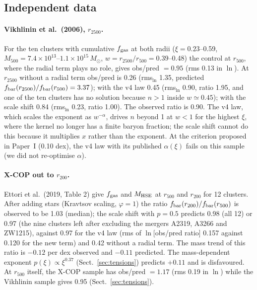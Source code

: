 \documentclass[11pt,a4paper]{article}
\newcommand{\Msun}{M_\odot}
\newcommand{\fbar}{f_{\rm bar}}
\newcommand{\fgas}{f_{\rm gas}}
\begin{document}
\subsection{Independent data}
\paragraph{Vikhlinin et al.\ (2006), $r_{2500}$.} For the ten clusters with cumulative $\fgas$ at both radii ($\xi=0.23$--0.59, $M_{500}=7.4\times10^{13}$--$1.1\times10^{15}\,\Msun$, $w=r_{2500}/r_{500}=0.39$--0.48) the control at $r_{500}$, where the radial term plays no role, gives obs/pred $=0.95$ (rms 0.13 in $\ln$). At $r_{2500}$ without a radial term obs/pred is 0.26 (rms$_{\ln}$ 1.35, predicted $\fbar(r_{2500})/\fbar(r_{500})=3.37$); with the v4 law 0.45 (rms$_{\ln}$ 0.90, ratio 1.95, and one of the ten clusters has no solution because $n>1$ inside $w\simeq0.45$); with the scale shift 0.84 (rms$_{\ln}$ 0.23, ratio 1.00). The observed ratio is 0.90. The v4 law, which scales the exponent as $w^{-\alpha}$, drives $n$ beyond 1 at $w<1$ for the highest $\xi$, where the kernel no longer has a finite baryon fraction; the scale shift cannot do this because it multiplies $x$ rather than the exponent. At the criterion proposed in Paper~I (0.10 dex), the v4 law with its published $\alpha(\xi)$ fails on this sample (we did not re-optimise $\alpha$).

\paragraph{X-COP out to $r_{200}$.} Ettori et al.\ (2019, Table 2) give $\fgas$ and $M_{\rm HSE}$ at $r_{500}$ and $r_{200}$ for 12 clusters. After adding stars (Kravtsov scaling, $\varphi=1$) the ratio $\fbar(r_{200})/\fbar(r_{500})$ is observed to be 1.03 (median); the scale shift with $p=0.5$ predicts 0.98 (all 12) or 0.97 (the nine clusters left after excluding the mergers A2319, A3266 and ZW1215), against 0.97 for the v4 law (rms of $\ln$[obs/pred ratio] 0.157 against 0.120 for the new term) and 0.42 without a radial term. The mass trend of this ratio is $-0.12$ per dex observed and $-0.11$ predicted. The mass-dependent exponent $p(\xi)\propto\xi^{0.37}$ (Sect.~\ref{sec:tensions}) predicts $+0.11$ and is disfavoured. At $r_{500}$ itself, the X-COP sample has obs/pred $=1.17$ (rms 0.19 in $\ln$) while the Vikhlinin sample gives 0.95 (Sect.~\ref{sec:tensions}).
\end{document}
